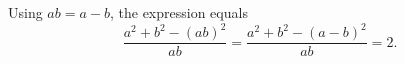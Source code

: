 Using $ab=a-b$, the expression equals
\[\dfrac{a^2+b^2-(ab)^2}{ab}=\dfrac{a^2+b^2-(a-b)^2}{ab}=\boxed2.\]
